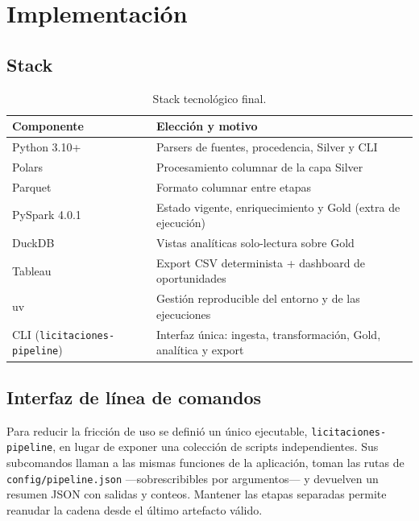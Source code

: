 \documentclass[11pt,a4paper]{article}
\newcommand{\cabecera}[1]{{\bfseries #1}}
\begin{document}
\clearpage
\section{Implementación}

\subsection{Stack}

\begin{table}[H]
\centering
\small
\begin{tabularx}{\textwidth}{@{}l X@{}}
\toprule
\cabecera{Componente} & \cabecera{Elección y motivo}\\
\midrule
Python 3.10+ & Parsers de fuentes, procedencia, Silver y CLI\\
Polars & Procesamiento columnar de la capa Silver\\
Parquet & Formato columnar entre etapas\\
PySpark 4.0.1 & Estado vigente, enriquecimiento y Gold (extra de ejecución)\\
DuckDB & Vistas analíticas solo-lectura sobre Gold\\
Tableau & Export CSV determinista + dashboard de oportunidades\\
uv & Gestión reproducible del entorno y de las ejecuciones\\
CLI (\texttt{licitaciones-pipeline}) & Interfaz única: ingesta, transformación, Gold, analítica y export\\
\bottomrule
\end{tabularx}
\caption{Stack tecnológico final.}
\end{table}

\subsection{Interfaz de línea de comandos}

Para reducir la fricción de uso se definió un único ejecutable,
\texttt{licitaciones-pipeline}, en lugar de exponer una colección de scripts
independientes. Sus subcomandos llaman a las mismas funciones de la aplicación,
toman las rutas de \texttt{config/pipeline.json} ---sobrescribibles por
argumentos--- y devuelven un resumen JSON con salidas y conteos. Mantener las
etapas separadas permite reanudar la cadena desde el último artefacto válido.
\end{document}
